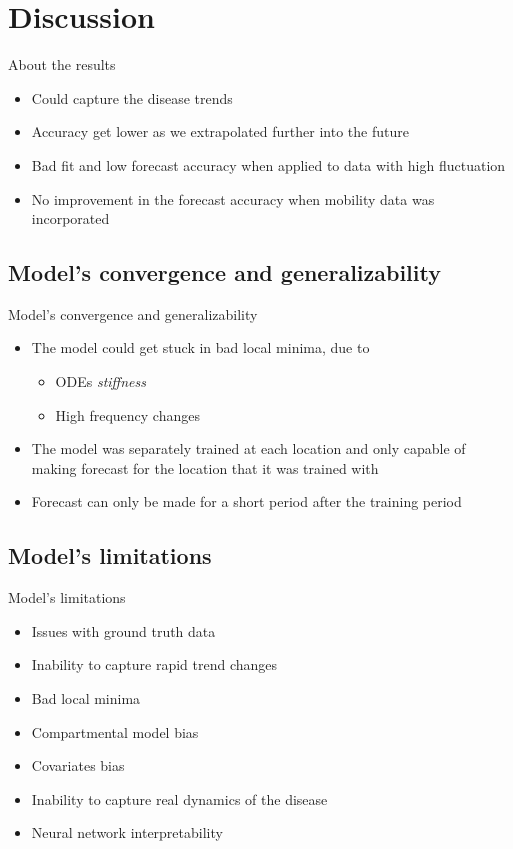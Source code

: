 \section{Discussion}

\begin{frame}{About the results}
    \begin{itemize}
        \item<1-> Could capture the disease trends
        \item<2-> Accuracy get lower as we extrapolated further into the future
        \item<3-> Bad fit and low forecast accuracy when applied to data with high fluctuation
        \item<4-> No improvement in the forecast accuracy when mobility data was incorporated
    \end{itemize}
\end{frame}

\subsection{Model's convergence and generalizability}

\begin{frame}{Model's convergence and generalizability}
    \begin{itemize}
        \item<1-> The model could get stuck in bad local minima, due to
        \begin{itemize}
            \item \glspl{ODE} \textit{stiffness}
            \item High frequency changes
        \end{itemize}
        \item<2-> The model was separately trained at each location and only capable of making forecast for the location that it was trained with
        \item<3-> Forecast can only be made for a short period after the training period
    \end{itemize}
\end{frame}

\subsection{Model's limitations}

\begin{frame}{Model's limitations}
    \begin{itemize}
        \item<1-> Issues with ground truth data
        \item<2-> Inability to capture rapid trend changes
        \item<3-> Bad local minima
        \item<4-> Compartmental model bias
        \item<5-> Covariates bias
        \item<6-> Inability to capture real dynamics of the disease
        \item<7-> Neural network interpretability
    \end{itemize}
\end{frame}